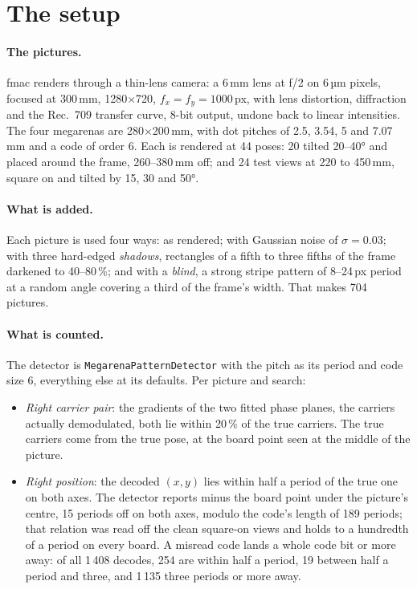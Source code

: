 \documentclass[10pt,a4paper]{article}
\begin{document}
\section{The setup}

\paragraph{The pictures.} fmac renders through a thin-lens camera: a 6\,mm
lens at f/2 on 6\,µm pixels, focused at 300\,mm, 1280$\times$720,
$f_x = f_y = 1000$\,px, with lens distortion, diffraction and the Rec.~709
transfer curve, 8-bit output, undone back to linear intensities. The four
megarenas are 280$\times$200\,mm, with dot pitches of 2.5, 3.54, 5 and
7.07\,mm and a code of order 6. Each is rendered at 44 poses: 20 tilted
20--40° and placed around the frame, 260--380\,mm off; and 24 test views at
220 to 450\,mm, square on and tilted by 15, 30 and 50°.

\paragraph{What is added.} Each picture is used four ways: as rendered;
with Gaussian noise of $\sigma = 0.03$; with three hard-edged \emph{shadows},
rectangles of a fifth to three fifths of the frame darkened to 40--80\,\%; and
with a \emph{blind}, a strong stripe pattern of 8--24\,px period at a random
angle covering a third of the frame's width. That makes 704 pictures.

\paragraph{What is counted.} The detector is
\texttt{MegarenaPatternDetector} with the pitch as its period and code size 6,
everything else at its defaults. Per picture and search:
\begin{itemize}
  \item \emph{Right carrier pair}: the gradients of the two fitted phase
        planes, the carriers actually demodulated, both lie within 20\,\% of
        the true carriers. The true carriers come from the true pose, at the
        board point seen at the middle of the picture.
  \item \emph{Right position}: the decoded $(x, y)$ lies within half a period
        of the true one on both axes. The detector reports minus the board
        point under the picture's centre, 15 periods off on both axes,
        modulo the code's length of 189 periods; that relation was read off
        the clean square-on views and holds to a hundredth of a period on
        every board. A misread code lands a whole code bit or more away:
        of all 1\,408 decodes, 254 are within half a period, 19 between half
        a period and three, and 1\,135 three periods or more away.
\end{itemize}
\end{document}
